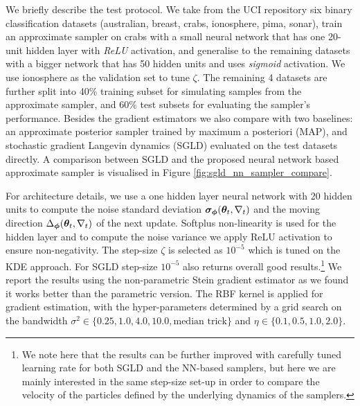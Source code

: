 We briefly describe the test protocol. We take from the UCI repository \citep{Lichman:uci_data2013} six binary classification datasets (australian, breast, crabs, ionosphere, pima, sonar), train an approximate sampler on crabs with a small neural network that has one 20-unit hidden layer with \emph{ReLU} activation, and generalise to the remaining datasets with a bigger network that has 50 hidden units and uses \emph{sigmoid} activation. We use ionosphere as the validation set to tune $\zeta$. The remaining 4 datasets are further split into 40\% training subset for simulating samples from the approximate sampler, and 60\% test subsets for evaluating the sampler's performance.
%
Besides the gradient estimators we also compare with two baselines: an approximate posterior sampler trained by maximum a posteriori (MAP), and stochastic gradient Langevin dynamics (SGLD) \citep{welling:sgld2011} evaluated on the test datasets directly. A comparison between SGLD and the proposed neural network based approximate sampler is visualised in Figure \ref{fig:sgld_nn_sampler_compare}. 

For architecture details, we use a one hidden layer neural network with 20 hidden units to compute the noise standard deviation $\bm{\sigma}_{\bm{\phi}}(\bm{\theta}_t, \nabla_t)$ and the moving direction $\Delta_{\bm{\phi}}(\bm{\theta}_t, \nabla_t)$ of the next update. Softplus non-linearity is used for the hidden layer and to compute the noise variance we apply ReLU activation to ensure non-negativity. The step-size $\zeta$ is selected as $10^{-5}$ which is tuned on the KDE approach. For SGLD step-size $10^{-5}$ also returns overall good results.\footnote{We note here that the results can be further improved with carefully tuned learning rate for both SGLD and the NN-based samplers, but here we are mainly interested in the same step-size set-up in order to compare the velocity of the particles defined by the underlying dynamics of the samplers.}
We report the results using the non-parametric Stein gradient estimator as we found it works better than the parametric version. The RBF kernel is applied for gradient estimation, with the hyper-parameters determined by a grid search on the bandwidth $\sigma^2 \in \{0.25, 1.0, 4.0, 10.0, \text{median trick} \}$ and $\eta \in \{0.1, 0.5, 1.0, 2.0\}$.

